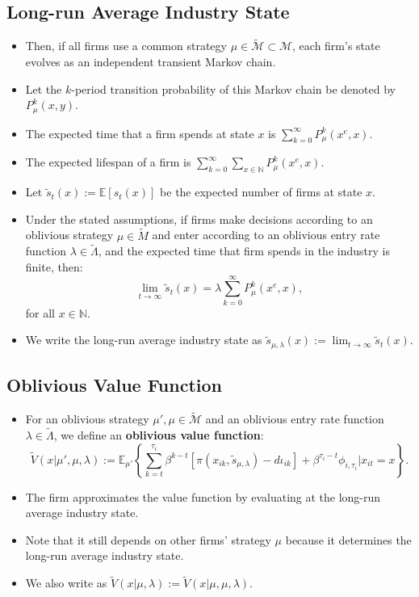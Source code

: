 \documentclass[
]{book}
\providecommand{\tightlist}{%
  \setlength{\itemsep}{0pt}\setlength{\parskip}{0pt}}
\begin{document}
\hypertarget{long-run-average-industry-state}{%
\subsection{Long-run Average Industry State}\label{long-run-average-industry-state}}

\begin{itemize}
\tightlist
\item
  Then, if all firms use a common strategy \(\mu \in \widetilde{\mathcal{M}} \subset \mathcal{M}\), each firm's state evolves as an independent transient Markov chain.
\item
  Let the \(k\)-period transition probability of this Markov chain be denoted by \(P_{\mu}^k(x, y)\).
\item
  The expected time that a firm spends at state \(x\) is \(\sum_{k = 0}^\infty P_\mu^k(x^e, x)\).
\item
  The expected lifespan of a firm is \(\sum_{k = 0}^\infty \sum_{x \in \mathbb{N}} P_\mu^k(x^e, x)\).
\item
  Let \(\tilde{s}_t(x) := \mathbb{E}[s_t(x)]\) be the expected number of firms at state \(x\).
\item
  Under the stated assumptions, if firms make decisions according to an oblivious strategy \(\mu \in \widetilde{M}\) and enter according to an oblivious entry rate function \(\lambda \in \widetilde{\Lambda}\), and the expected time that firm spends in the industry is finite, then:
  \[
   \lim_{t \to \infty} \tilde{s}_t(x) = \lambda \sum_{k = 0}^\infty P_{\mu}^k(x^e, x),
   \]
  for all \(x \in \mathbb{N}\).
\item
  We write the long-run average industry state as \(\tilde{s}_{\mu, \lambda}(x) := \lim_{t \to \infty} \tilde{s}_t(x)\).
\end{itemize}

\hypertarget{oblivious-value-function}{%
\subsection{Oblivious Value Function}\label{oblivious-value-function}}

\begin{itemize}
\item
  For an oblivious strategy \(\mu', \mu \in \widetilde{\mathcal{M}}\) and an oblivious entry rate function \(\lambda \in \widetilde{\Lambda}\), we define an \textbf{oblivious value function}:
  \[
  \widetilde{V}(x|\mu', \mu, \lambda) := \mathbb{E}_{\mu'} \left\{\sum_{k = t}^{\tau_i} \beta^{k - t}[\pi(x_{ik}, \tilde{s}_{\mu, \lambda}) - d \iota_{ik}] + \beta^{\tau_i - t} \phi_{i, \tau_i}| x_{it} = x \right\}.
  \]
\item
  The firm approximates the value function by evaluating at the long-run average industry state.
\item
  Note that it still depends on other firms' strategy \(\mu\) because it determines the long-run average industry state.
\item
  We also write as \(\widetilde{V}(x|\mu, \lambda) := \widetilde{V}(x|\mu, \mu, \lambda)\).
\end{itemize}
\end{document}
